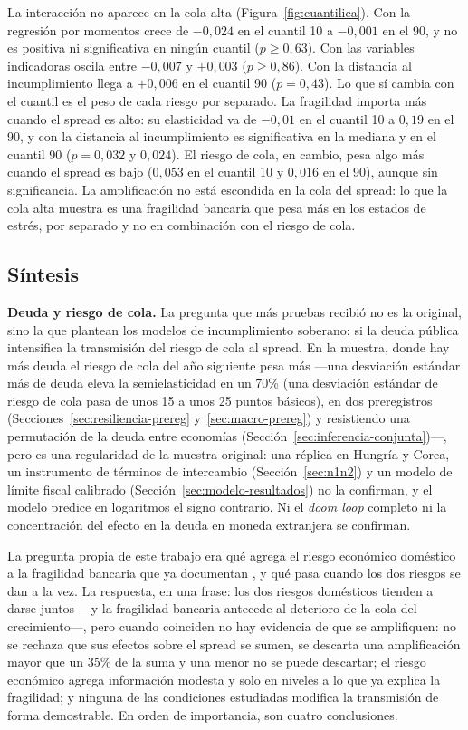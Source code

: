 La interacción no aparece en la cola alta (Figura~\ref{fig:cuantilica}). Con la regresión por momentos crece de $-0{,}024$ en el cuantil 10 a $-0{,}001$ en el 90, y no es positiva ni significativa en ningún cuantil ($p\geq0{,}63$). Con las variables indicadoras oscila entre $-0{,}007$ y $+0{,}003$ ($p\geq0{,}86$). Con la distancia al incumplimiento llega a $+0{,}006$ en el cuantil 90 ($p=0{,}43$). Lo que sí cambia con el cuantil es el peso de cada riesgo por separado. La fragilidad importa más cuando el spread es alto: su elasticidad va de $-0{,}01$ en el cuantil 10 a $0{,}19$ en el 90, y con la distancia al incumplimiento es significativa en la mediana y en el cuantil 90 ($p=0{,}032$ y $0{,}024$). El riesgo de cola, en cambio, pesa algo más cuando el spread es bajo ($0{,}053$ en el cuantil 10 y $0{,}016$ en el 90), aunque sin significancia. La amplificación no está escondida en la cola del spread: lo que la cola alta muestra es una fragilidad bancaria que pesa más en los estados de estrés, por separado y no en combinación con el riesgo de cola.

\subsection{Síntesis}
\label{sec:sintesis-resultados}

\textbf{Deuda y riesgo de cola.} La pregunta que más pruebas recibió no es la original, sino la que plantean los modelos de incumplimiento soberano: si la deuda pública intensifica la transmisión del riesgo de cola al spread. En la muestra, donde hay más deuda el riesgo de cola del año siguiente pesa más ---una desviación estándar más de deuda eleva la semielasticidad en un 70\% (una desviación estándar de riesgo de cola pasa de unos 15 a unos 25 puntos básicos), en dos preregistros (Secciones~\ref{sec:resiliencia-prereg} y~\ref{sec:macro-prereg}) y resistiendo una permutación de la deuda entre economías (Sección~\ref{sec:inferencia-conjunta})---, pero es una regularidad de la muestra original: una réplica en Hungría y Corea, un instrumento de términos de intercambio (Sección~\ref{sec:n1n2}) y un modelo de límite fiscal calibrado (Sección~\ref{sec:modelo-resultados}) no la confirman, y el modelo predice en logaritmos el signo contrario. Ni el \textit{doom loop} completo ni la concentración del efecto en la deuda en moneda extranjera se confirman.

La pregunta propia de este trabajo era qué agrega el riesgo económico doméstico a la fragilidad bancaria que ya documentan \citet{Chari2024b}, y qué pasa cuando los dos riesgos se dan a la vez. La respuesta, en una frase: los dos riesgos domésticos tienden a darse juntos ---y la fragilidad bancaria antecede al deterioro de la cola del crecimiento---, pero cuando coinciden no hay evidencia de que se amplifiquen: no se rechaza que sus efectos sobre el spread se sumen, se descarta una amplificación mayor que un 35\% de la suma y una menor no se puede descartar; el riesgo económico agrega información modesta y solo en niveles a lo que ya explica la fragilidad; y ninguna de las condiciones estudiadas modifica la transmisión de forma demostrable. En orden de importancia, son cuatro conclusiones.

